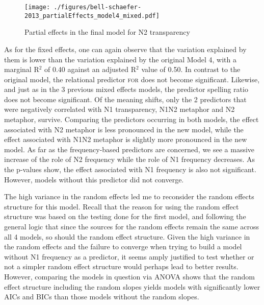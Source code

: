 \begin{figure}[!htb]
  \centering
\texttt{[image: ./figures/bell-schaefer-2013\_partialEffects\_model4\_mixed.pdf]}
  
  \caption{Partial effects in the final model for N2 transparency}
\label{fig:bellschaefer2013_model_4-mixed-effects}
\end{figure}

As for the fixed effects, one can again observe that the
variation explained by them is lower than the variation
explained by the original Model 4, with a marginal R$^2$ of 0.40 against
an adjusted R$^2$ value of 0.50. In contrast to the original model,
the relational predictor \textsc{for} does not become significant. Likewise,
and just as in the 3 previous mixed effects models, the predictor
spelling ratio does not become significant. Of the meaning shifts,
only the 2 predictors that were negatively correlated with N1
transparency, N1N2 metaphor and N2 metaphor, survive. Comparing the predictors
occurring in both models, the effect associated with N2 metaphor is
less pronounced in the new model, while the effect associated with
N1N2 metaphor is slightly more pronounced in the new model. As far as
the frequency-based predictors are concerned, we see a massive
increase of the role of N2 frequency while the role of N1 frequency
decreases. As the p-values show, the effect associated with N1
frequency is also not significant. However, models without this
predictor did not converge.

The high variance in the random effects led me to reconsider the random effects structure for this model.
Recall that the reason for using the random effect structure
was based on the testing done for the first model, and following the
general logic that since the sources for the random effects remain the
same across all 4 models, so should the random effect
structure. Given the high variance in the random effects and
the failure to converge when trying to build a model without N1
frequency as a predictor, it seems amply justified to test whether or
not a simpler random effect structure would perhaps lead to better
results. However, comparing the models in question via ANOVA shows
that the random effect structure including the random slopes yields
models with significantly lower AICs and BICs than those models
without the random slopes.


